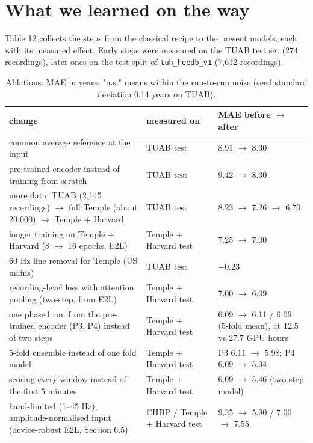\documentclass[11pt,a4paper]{article}
\begin{document}
\section{What we learned on the way}

Table 12 collects the steps from the classical recipe to the present models, each with its measured effect. Early steps were measured on the TUAB test set (274 recordings), later ones on the test split of \texttt{tuh\_heedb\_v1} (7,612 recordings).

\begin{table}[t]
\centering
\small
\caption{Ablations. MAE in years; "n.s." means within the run-to-run noise (seed standard deviation 0.14 years on TUAB).}
\begin{tabular}{lll}
\toprule
\textbf{change} & \textbf{measured on} & \textbf{MAE before $\rightarrow$ after} \\
\midrule
common average reference at the input & TUAB test & 8.91 $\rightarrow$ 8.30 \\
pre-trained encoder instead of training from scratch & TUAB test & 9.42 $\rightarrow$ 8.30 \\
more data: TUAB (2,145 recordings) $\rightarrow$ full Temple (about 20,000) $\rightarrow$ Temple + Harvard & TUAB test & 8.23 $\rightarrow$ 7.26 $\rightarrow$ 6.70 \\
longer training on Temple + Harvard (8 $\rightarrow$ 16 epochs, E2L) & Temple + Harvard test & 7.25 $\rightarrow$ 7.00 \\
60 Hz line removal for Temple (US mains) & TUAB test & $-$0.23 \\
recording-level loss with attention pooling (two-step, from E2L) & Temple + Harvard test & 7.00 $\rightarrow$ 6.09 \\
one phased run from the pre-trained encoder (P3, P4) instead of two steps & Temple + Harvard test & 6.09 $\rightarrow$ 6.11 / 6.09 (5-fold mean), at 12.5 vs 27.7 GPU hours \\
5-fold ensemble instead of one fold model & Temple + Harvard test & P3 6.11 $\rightarrow$ 5.98; P4 6.09 $\rightarrow$ 5.94 \\
scoring every window instead of the first 5 minutes & Temple + Harvard test & 6.09 $\rightarrow$ 5.46 (two-step model) \\
band-limited (1--45 Hz), amplitude-normalised input (device-robust E2L, Section 6.5) & CHBP / Temple + Harvard test & 9.35 $\rightarrow$ 5.90 / 7.00 $\rightarrow$ 7.55 \\
\bottomrule
\end{tabular}
\end{table}
\end{document}
